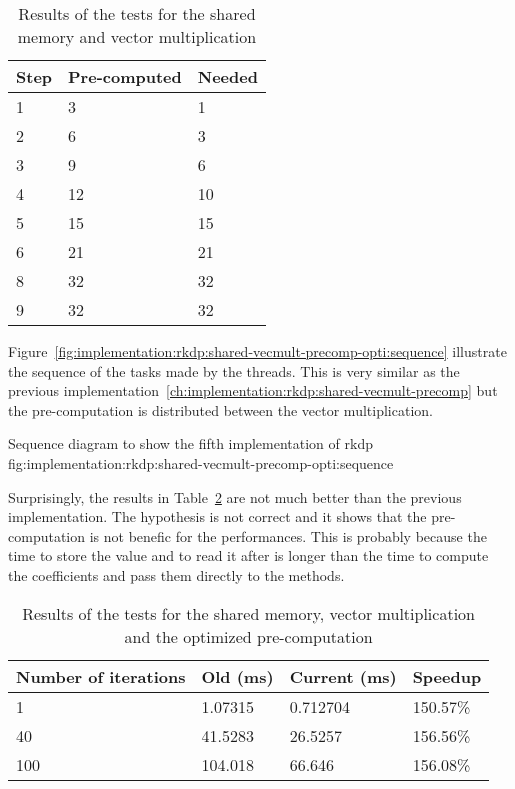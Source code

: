\begin{table}[ht]
    \centering
    \begin{tabular}{|l|l|l|}
        \hline
        \textbf{Step} & \textbf{Pre-computed} & \textbf{Needed} \\
        \hline
        1 & 3 & 1 \\
        \hline
        2 & 6 & 3 \\
        \hline
        3 & 9 & 6 \\
        \hline
        4 & 12 & 10 \\
        \hline
        5 & 15 & 15 \\
        \hline
        6 & 21 & 21 \\
        \hline
        8 & 32 & 32 \\
        \hline
        9 & 32 & 32 \\
        \hline
    \end{tabular}
    \caption{Results of the tests for the shared memory and vector multiplication}
    \label{tab:implementation:rkdp:shared-vecmult-precomp-opti:coefficients}
\end{table}

Figure~\ref{fig:implementation:rkdp:shared-vecmult-precomp-opti:sequence}
illustrate the sequence of the tasks made by the threads.
This is very similar as the previous implementation~\ref{ch:implementation:rkdp:shared-vecmult-precomp}
but the pre-computation is distributed between the vector multiplication.

{Sequence diagram to show the fifth implementation of \acrshort{rkdp}}
{fig:implementation:rkdp:shared-vecmult-precomp-opti:sequence}

Surprisingly, the results in Table~\ref{tab:implementation:rkdp:shared-vecmult-precomp-opti:results}
are not much better than the previous implementation.
The hypothesis is not correct and it shows that the pre-computation
is not benefic for the performances.
This is probably because the time to store the value and to read it after
is longer than the time to compute the coefficients and pass them directly to the methods.

\begin{table}[ht]
    \centering
    \begin{tabular}{|l|l|l|l|}
        \hline
        \textbf{Number of iterations} & \textbf{Old (ms)} & \textbf{Current (ms)} & \textbf{Speedup} \\
        \hline
        1 & 1.07315 & 0.712704 & 150.57\% \\
        \hline
        40 & 41.5283 & 26.5257 & 156.56\% \\
        \hline
        100 & 104.018 & 66.646 & 156.08\% \\
        \hline
    \end{tabular}
    \caption{Results of the tests for the shared memory, vector multiplication and the optimized pre-computation}
    \label{tab:implementation:rkdp:shared-vecmult-precomp-opti:results}
\end{table}

